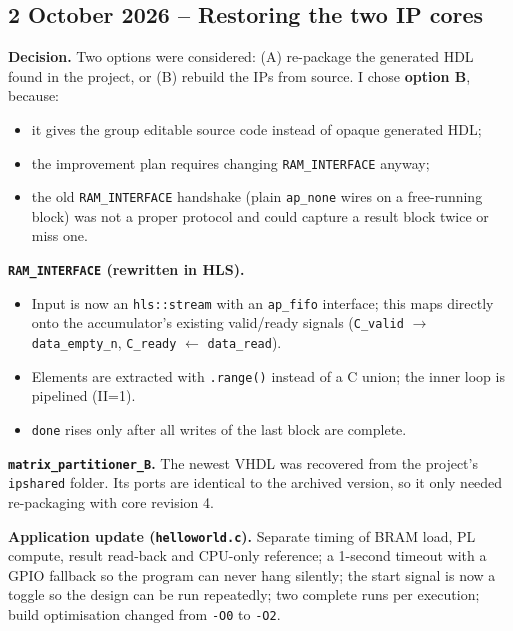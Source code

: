 \documentclass[11pt,a4paper]{article}
\newcommand{\code}[1]{\texttt{#1}}
\begin{document}
\subsection{2 October 2026 -- Restoring the two IP cores}
\textbf{Decision.} Two options were considered: (A) re-package the generated HDL found in the project, or (B) rebuild the IPs from source. I chose \textbf{option B}, because:
\begin{itemize}[noitemsep]
  \item it gives the group editable source code instead of opaque generated HDL;
  \item the improvement plan requires changing \code{RAM\_INTERFACE} anyway;
  \item the old \code{RAM\_INTERFACE} handshake (plain \code{ap\_none} wires on a free-running block) was not a proper protocol and could capture a result block twice or miss one.
\end{itemize}

\textbf{\code{RAM\_INTERFACE} (rewritten in HLS).}
\begin{itemize}[noitemsep]
  \item Input is now an \code{hls::stream} with an \code{ap\_fifo} interface; this maps directly onto the accumulator's existing valid/ready signals (\code{C\_valid} $\rightarrow$ \code{data\_empty\_n}, \code{C\_ready} $\leftarrow$ \code{data\_read}).
  \item Elements are extracted with \code{.range()} instead of a C union; the inner loop is pipelined (II=1).
  \item \code{done} rises only after all writes of the last block are complete.
\end{itemize}

\textbf{\code{matrix\_partitioner\_B}.} The newest VHDL was recovered from the project's \code{ipshared} folder. Its ports are identical to the archived version, so it only needed re-packaging with core revision 4.

\textbf{Application update (\code{helloworld.c}).} Separate timing of BRAM load, PL compute, result read-back and CPU-only reference; a 1-second timeout with a GPIO fallback so the program can never hang silently; the start signal is now a toggle so the design can be run repeatedly; two complete runs per execution; build optimisation changed from \code{-O0} to \code{-O2}.
\end{document}
